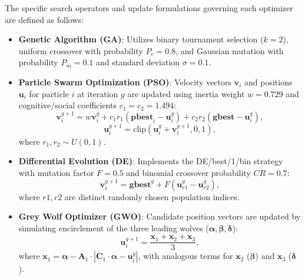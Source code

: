 The specific search operators and update formulations governing each optimizer are defined as follows:
\begin{itemize}
    \item \textbf{Genetic Algorithm (GA)}: Utilizes binary tournament selection ($k=2$), uniform crossover with probability $P_c = 0.8$, and Gaussian mutation with probability $P_m = 0.1$ and standard deviation $\sigma = 0.1$.
    \item \textbf{Particle Swarm Optimization (PSO)}: Velocity vectors $\mathbf{v}_i$ and positions $\mathbf{u}_i$ for particle $i$ at iteration $g$ are updated using inertia weight $w = 0.729$ and cognitive/social coefficients $c_1 = c_2 = 1.494$:
    \begin{equation}\label{eq:pso_update}
    \mathbf{v}_i^{g+1} = w \mathbf{v}_i^g + c_1 r_1 (\mathbf{pbest}_i - \mathbf{u}_i^g) + c_2 r_2 (\mathbf{gbest} - \mathbf{u}_i^g),
    \end{equation}
    \begin{equation}
    \mathbf{u}_i^{g+1} = \mathrm{clip}\left(\mathbf{u}_i^g + \mathbf{v}_i^{g+1}, 0, 1\right),
    \end{equation}
    where $r_1, r_2 \sim U(0, 1)$.
    \item \textbf{Differential Evolution (DE)}: Implements the DE/best/1/bin strategy with mutation factor $F = 0.5$ and binomial crossover probability $CR = 0.7$:
    \begin{equation}\label{eq:de_update}
    \mathbf{v}_i^{g+1} = \mathbf{gbest}^g + F (\mathbf{u}_{r1}^g - \mathbf{u}_{r2}^g),
    \end{equation}
    where $r1, r2$ are distinct randomly chosen population indices.
    \item \textbf{Grey Wolf Optimizer (GWO)}: Candidate position vectors are updated by simulating encirclement of the three leading wolves ($\bm{\alpha}, \bm{\beta}, \bm{\delta}$):
    \begin{equation}\label{eq:gwo_update}
    \mathbf{u}_i^{g+1} = \frac{\mathbf{x}_1 + \mathbf{x}_2 + \mathbf{x}_3}{3},
    \end{equation}
    where $\mathbf{x}_1 = \bm{\alpha} - \mathbf{A}_1 \cdot |\mathbf{C}_1 \cdot \bm{\alpha} - \mathbf{u}_i^g|$, with analogous terms for $\mathbf{x}_2$ ($\bm{\beta}$) and $\mathbf{x}_3$ ($\bm{\delta}$).
\end{itemize}

